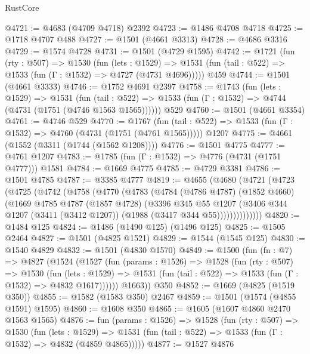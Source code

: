 \begin{lexlean}{RustCore}
\begin{coremodule}
@4721 := @4683 (@4709 @4718) @2392
@4723 := @1486 @4708 @4718
@4725 := @1718 @4707 @488
@4727 := @1501 (@4661 @3313)
@4728 := @4686 @3316
@4729 := @1574 @4728
@4731 := @1501 (@4729 @1595)
@4742 := @1721
    (fun (rty : @507) =>
    @1530
      (fun (lets : @1529) =>
      @1531 (fun (tail : @522) => @1533 (fun (Γ : @1532) => @4727 (@4731 @4696)))))
    @459
@4744 := @1501 (@4661 @3333)
@4746 := @1752 @4691 @2397
@4758 := @1743
    (fun (lets : @1529) =>
    @1531
      (fun (tail : @522) => @1533 (fun (Γ : @1532) => @4744 (@4731 (@1751 (@4746 @1563 @1565))))))
    @529
@4760 := @1501 (@4661 @3354)
@4761 := @4746 @529
@4770 := @1767
    (fun (tail : @522) => @1533 (fun (Γ : @1532) => @4760 (@4731 (@1751 (@4761 @1565)))))
    @1207
@4775 := @4661 (@1552 (@3311 (@1744 (@1562 @1208))))
@4776 := @1501 @4775
@4777 := @4761 @1207
@4783 := @1785 (fun (Γ : @1532) => @4776 (@4731 (@1751 @4777))) @1581
@4784 := @1669 @4775
@4785 := @4729 @3381
@4786 := @1501 @4785
@4787 := @3385 @4777
@4819 := @4655
    (@4680
      (@4721
        (@4723
          (@4725
            (@4742
              (@4758
                (@4770
                  (@4783
                    (@4784
                      (@4786 @4787)
                      (@1852 @4660)
                      (@1669
                        @4785
                        @4787
                        (@1857 @4728)
                        (@3396
                          @345
                          @55
                          @1207
                          (@3406
                            @344
                            @1207
                            (@3411 (@3412 @1207))
                            (@1988 (@3417 @344 @55))))))))))))))
@4820 := @1484 @125
@4824 := @1486 (@1490 @125) (@1496 @125)
@4825 := @1505 @2464
@4827 := @1501 (@4825 @1521)
@4829 := @1544 (@1545 @125)
@4830 := @1540 @4829
@4832 := @1501 (@4830 @1570)
@4849 := @1500
    (fun (fn : @7) =>
    @4827
      (@1524
        (@1527
          (fun (params : @1526) =>
          @1528
            (fun (rty : @507) =>
            @1530
              (fun (lets : @1529) =>
              @1531 (fun (tail : @522) => @1533 (fun (Γ : @1532) => @4832 @1617))))))
        @1663))
    @350
@4852 := @1669 (@4825 (@1519 @350))
@4855 := @1582 (@1583 @350) @2467
@4859 := @1501 (@1574 (@4855 @1591) @1595)
@4860 := @1608 @350
@4865 := @1605 (@1607 @4860 @2470 @1563 @1565)
@4876 := fun (params : @1526) =>
  @1528
    (fun (rty : @507) =>
    @1530
      (fun (lets : @1529) =>
      @1531 (fun (tail : @522) => @1533 (fun (Γ : @1532) => @4832 (@4859 @4865)))))
@4877 := @1527 @4876

\end{coremodule}
\end{lexlean}

